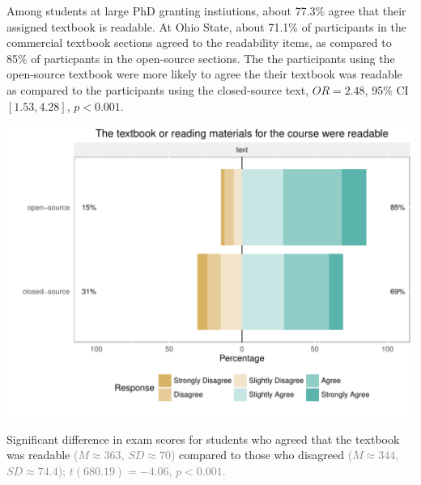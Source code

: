 \documentclass{ximera}
\begin{document}
Among students at large PhD granting instiutions, about 77.3\% agree
that their assigned textbook is readable.  At Ohio State, about 71.1\%
of participants in the commercial textbook sections agreed to the
readability items, as compared to 85\% of particpants in the
open-source sections.  The the participants using the open-source
textbook were more likely to agree the their textbook was readable as
compared to the participants using the closed-source text,
\(OR = 2.48\), 95\% CI \([ 1.53 , 4.28 ]\), \(p < 0.001\).

\begin{image}
  \includegraphics{more-readable.pdf}
\end{image}

Significant difference in exam scores for students who agreed that the
textbook was readable \textcolor{gray}{(\(M \approx 363\),
  \(SD \approx 70\))} compared to those who disagreed
\textcolor{gray}{(\(M \approx 344\), \(SD \approx 74.4\));}
\textcolor{gray}{\(t( 680.19 ) = -4.06\), \(p < 0.001\).}
\end{document}
